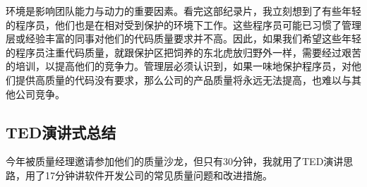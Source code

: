 环境是影响团队能力与动力的重要因素。看完这部纪录片，我立刻想到了有些年轻的程序员，他们也是在相对受到保护的环境下工作。这些程序员可能已习惯了管理层或经验丰富的同事对他们的代码质量要求并不高。因此，如果我们希望这些年轻的程序员注重代码质量，就跟保护区把饲养的东北虎放归野外一样，需要经过艰苦的培训，以提高他们的竞争力。管理层必须认识到，如果一味地保护程序员，对他们提供高质量的代码没有要求，那么公司的产品质量将永远无法提高，也难以与其他公司竞争。


\hypertarget{tedux6f14ux8bb2ux5f0fux603bux7ed3}{%
\subsection{TED演讲式总结}\label{tedux6f14ux8bb2ux5f0fux603bux7ed3}}

今年被质量经理邀请参加他们的质量沙龙，但只有30分钟，我就用了TED演讲思路，用了17分钟讲软件开发公司的常见质量问题和改进措施。

